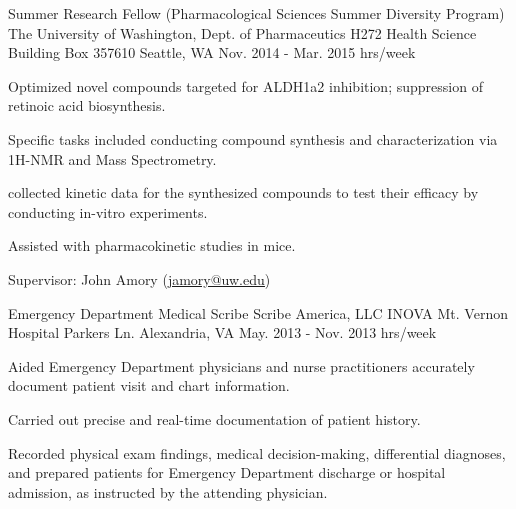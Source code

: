 \begin{cventries}
  \cventry
    {
Summer Research Fellow (Pharmacological Sciences Summer Diversity Program) }%
    {The University of Washington, Dept. of Pharmaceutics  } %
    {H272 Health Science Building \newline
Box 357610 \newline
Seattle, WA
} %
    {Nov. 2014 - Mar. 2015  hrs/week} %
    {
      \begin{cvitems} %
        \item {Optimized novel compounds targeted for ALDH1a2 inhibition; suppression of retinoic acid biosynthesis.}
        \item{Specific tasks included conducting compound synthesis and characterization via 1H-NMR and Mass Spectrometry.}
        \item{collected kinetic data for the synthesized compounds to test their efficacy by conducting in-vitro experiments.}
        \item{Assisted with pharmacokinetic studies in mice.}
         \item{Supervisor: John Amory (\textcolor{navyblue}{
        {\underline{\href{mailto:jamory@uw.edu}{jamory@uw.edu}}}})}
      \end{cvitems}
    }


  \cventry
    {Emergency Department Medical Scribe} %
    {Scribe America, LLC } %
    {INOVA Mt. Vernon Hospital  Parkers Ln. \newline
Alexandria, VA
} %
    {May. 2013 - Nov. 2013   hrs/week} %
    {
      \begin{cvitems} %
        \item {Aided Emergency Department physicians and nurse practitioners accurately document patient visit and chart information.}
        \item{Carried out precise and real-time documentation of patient history.}
        \item{Recorded physical exam findings, medical decision-making, differential diagnoses, and prepared patients for Emergency Department discharge or hospital admission, as instructed by the attending physician.}
      \end{cvitems}
    }


\end{cventries}
